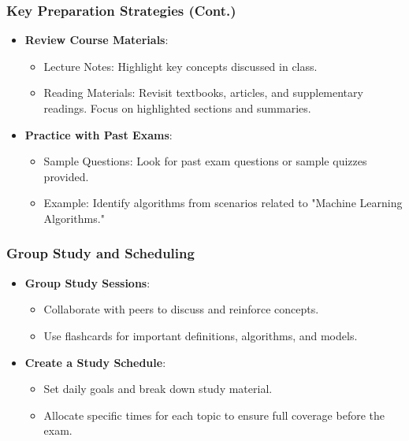 \documentclass[aspectratio=169]{beamer}
\begin{document}
\begin{frame}[fragile]
    \frametitle{Key Preparation Strategies (Cont.)}
    \begin{itemize}
        \item \textbf{Review Course Materials}:
        \begin{itemize}
            \item Lecture Notes: Highlight key concepts discussed in class.
            \item Reading Materials: Revisit textbooks, articles, and supplementary readings. Focus on highlighted sections and summaries.
        \end{itemize}
        
        \item \textbf{Practice with Past Exams}:
        \begin{itemize}
            \item Sample Questions: Look for past exam questions or sample quizzes provided.
            \item Example: Identify algorithms from scenarios related to "Machine Learning Algorithms."
        \end{itemize}
    \end{itemize}
\end{frame}

\begin{frame}
    \frametitle{Group Study and Scheduling}
    \begin{itemize}
        \item \textbf{Group Study Sessions}:
        \begin{itemize}
            \item Collaborate with peers to discuss and reinforce concepts.
            \item Use flashcards for important definitions, algorithms, and models.
        \end{itemize}
        
        \item \textbf{Create a Study Schedule}:
        \begin{itemize}
            \item Set daily goals and break down study material.
            \item Allocate specific times for each topic to ensure full coverage before the exam.
        \end{itemize}
    \end{itemize}
\end{frame}
\end{document}
